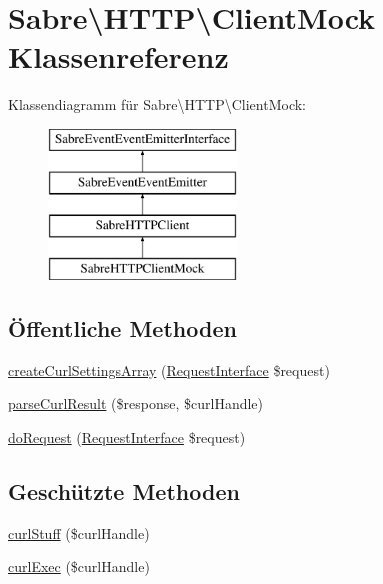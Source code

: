 \hypertarget{class_sabre_1_1_h_t_t_p_1_1_client_mock}{}\section{Sabre\textbackslash{}H\+T\+TP\textbackslash{}Client\+Mock Klassenreferenz}
\label{class_sabre_1_1_h_t_t_p_1_1_client_mock}
Klassendiagramm für Sabre\textbackslash{}H\+T\+TP\textbackslash{}Client\+Mock\+:\begin{figure}[H]
\begin{center}
\leavevmode
\includegraphics[height=4.000000cm]{class_sabre_1_1_h_t_t_p_1_1_client_mock}
\end{center}
\end{figure}
\subsection*{Öffentliche Methoden}
\begin{DoxyCompactItemize}
\item 
\mbox{\hyperlink{class_sabre_1_1_h_t_t_p_1_1_client_mock_ac83aafac44e24b308a22a4043b4f308d}{create\+Curl\+Settings\+Array}} (\mbox{\hyperlink{interface_sabre_1_1_h_t_t_p_1_1_request_interface}{Request\+Interface}} \$request)
\item 
\mbox{\hyperlink{class_sabre_1_1_h_t_t_p_1_1_client_mock_a14f13401b12eaeafc2c9a1eadef76cb8}{parse\+Curl\+Result}} (\$response, \$curl\+Handle)
\item 
\mbox{\hyperlink{class_sabre_1_1_h_t_t_p_1_1_client_mock_afd41b0c0bf662a9d56c46add525a66e5}{do\+Request}} (\mbox{\hyperlink{interface_sabre_1_1_h_t_t_p_1_1_request_interface}{Request\+Interface}} \$request)
\end{DoxyCompactItemize}
\subsection*{Geschützte Methoden}
\begin{DoxyCompactItemize}
\item 
\mbox{\hyperlink{class_sabre_1_1_h_t_t_p_1_1_client_mock_adc3f829c4f3cc4f4fc47925fc143363d}{curl\+Stuff}} (\$curl\+Handle)
\item 
\mbox{\hyperlink{class_sabre_1_1_h_t_t_p_1_1_client_mock_a8883ea353a5269d0b820e8c0503cadfc}{curl\+Exec}} (\$curl\+Handle)
\end{DoxyCompactItemize}
